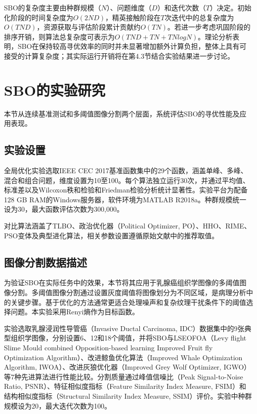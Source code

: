SBO的复杂度主要由种群规模（$N$）、问题维度（$D$）和迭代次数（$T$）决定。初始化阶段的时间复杂度为$O(2ND)$，精英接触阶段在$T$次迭代中的总复杂度为$O(TND)$，资源获取与评估阶段累计贡献约$O(TN)$。若进一步考虑巩固阶段的排序开销，则算法总复杂度可表示为$O(TND+TN+TNlogN)$。理论分析表明，SBO在保持较高寻优效率的同时并未显著增加额外计算负担，整体上具有可接受的计算复杂度；其实际运行开销将在第4.3节结合实验结果进一步讨论。


\section{SBO的实验研究}

本节从连续基准测试和多阈值图像分割两个层面，系统评估SBO的寻优性能及应用表现。

\subsection{实验设置}

全局优化实验选取IEEE CEC 2017基准函数集中的29个函数\cite{sbo_ref48}，涵盖单峰、多峰、混合和组合问题，维度设置为10至100。每个算法独立运行30次，并通过平均值、标准差以及Wilcoxon秩和检验和Friedman检验分析统计显著性。实验平台为配备128 GB RAM的Windows服务器，软件环境为MATLAB R2018a。种群规模统一设为30，最大函数评估次数为300,000。

对比算法涵盖了TLBO、政治优化器（Political Optimizer, PO）、HHO、RIME、PSO变体及典型进化算法，相关参数设置遵循原始文献中的推荐取值。

\subsection{图像分割数据描述}

为验证SBO在实际任务中的效果，本节将其应用于乳腺癌组织学图像的多阈值图像分割。多阈值图像分割通过设置灰度阈值将图像划分为不同区域，是病理分析中的关键步骤\cite{sbo_ref79}。基于优化的方法通常更适合处理噪声和复杂纹理干扰条件下的阈值选择问题\cite{sbo_ref82}。本实验采用Renyi熵作为目标函数。

实验选取乳腺浸润性导管癌（Invasive Ductal Carcinoma, IDC）数据集中的9张典型组织学图像，分别设置6、12和18个阈值，并将SBO与LSEOFOA（Levy flight Slime Mould combined Opposition-based learning Improved Fruit fly Optimization Algorithm）、改进鲸鱼优化算法（Improved Whale Optimization Algorithm, IWOA）、改进灰狼优化器（Improved Grey Wolf Optimizer, IGWO）等7种先进算法进行性能比较。分割质量通过峰值信噪比（Peak Signal-to-Noise Ratio, PSNR）、特征相似度指标（Feature Similarity Index Measure, FSIM）和结构相似度指标（Structural Similarity Index Measure, SSIM）评价。实验中种群规模设为20，最大迭代次数为100。

